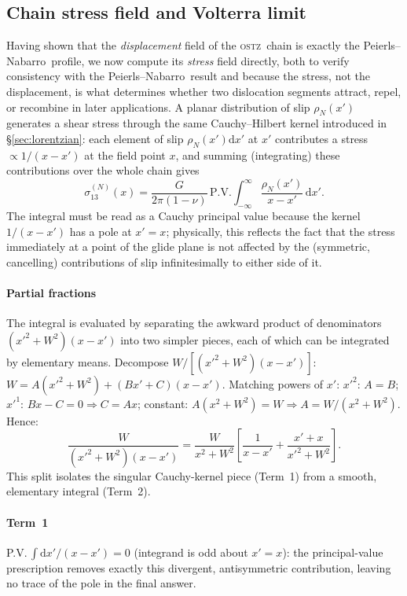 \documentclass[3p]{elsarticle}
\newcommand{\OSTZ}{\textsc{ostz}}
\newcommand{\PN}{Peierls--Nabarro}
\begin{document}
\subsection{Chain stress field and Volterra limit}
\label{sec:chainStress}

Having shown that the \emph{displacement} field of the \OSTZ\ chain
is exactly the \PN\ profile, we now compute its \emph{stress} field
directly, both to verify consistency with the \PN\ result and
because the stress, not the displacement, is what determines whether
two dislocation segments attract, repel, or recombine in later
applications. A planar distribution of slip $\rho_N(x')$ generates a
shear stress through the same Cauchy--Hilbert kernel introduced in
\S\ref{sec:lorentzian}: each element of slip $\rho_N(x')\mathrm dx'$
at $x'$ contributes a stress $\propto1/(x-x')$ at the field point
$x$, and summing (integrating) these contributions over the whole
chain gives
\begin{equation}
  \sigma_{13}^{(N)}(x)=\frac{G}{2\pi(1-\nu)}\,\mathrm{P.V.}
  \int_{-\infty}^\infty\frac{\rho_N(x')}{x-x'}\,\mathrm dx'.
  \label{eq:conv}
\end{equation}
The integral must be read as a Cauchy principal value because the
kernel $1/(x-x')$ has a pole at $x'=x$; physically, this reflects the
fact that the stress immediately at a point of the glide plane is
not affected by the (symmetric, cancelling) contributions of slip
infinitesimally to either side of it.

\paragraph{Partial fractions}
The integral is evaluated by separating the awkward product of
denominators $(x'^2+W^2)(x-x')$ into two simpler pieces, each of
which can be integrated by elementary means. Decompose
$W/[(x'^2+W^2)(x-x')]$:
$W=A(x'^2+W^2)+(Bx'+C)(x-x')$.
Matching powers of $x'$:
$x'^2$: $A=B$;
$x'^1$: $Bx-C=0\Rightarrow C=Ax$;
constant: $A(x^2+W^2)=W\Rightarrow A=W/(x^2+W^2)$.
Hence:
\[
  \frac{W}{(x'^2+W^2)(x-x')}
  =\frac{W}{x^2+W^2}\!\left[\frac{1}{x-x'}
  +\frac{x'+x}{x'^2+W^2}\right].
\]
This split isolates the singular Cauchy-kernel piece (Term~1) from a
smooth, elementary integral (Term~2).

\paragraph{Term~1}
P.V.\,$\int\mathrm dx'/(x-x')=0$ (integrand is odd about $x'=x$): the
principal-value prescription removes exactly this divergent,
antisymmetric contribution, leaving no trace of the pole in the
final answer.
\end{document}
